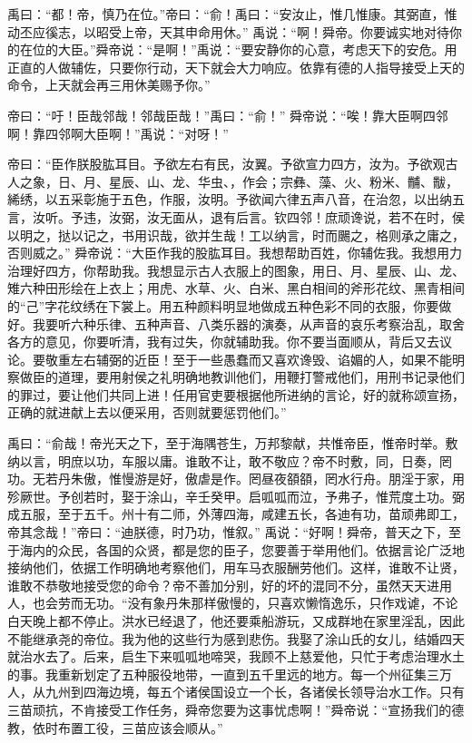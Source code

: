 \documentclass[a4paper,12pt,UTF8,twoside]{ctexbook}
\begin{document}
禹曰：“都！帝，慎乃在位。”帝曰：“俞！禹曰：“安汝止，惟几惟康。其弼直，惟动丕应徯志，以昭受上帝，天其申命用休。”
禹说：“啊！舜帝。你要诚实地对待你的在位的大臣。”舜帝说：“是啊！”禹说：“要安静你的心意，考虑天下的安危。用正直的人做辅佐，只要你行动，天下就会大力响应。依靠有德的人指导接受上天的命令，上天就会再三用休美赐予你。”

帝曰：“吁！臣哉邻哉！邻哉臣哉！”禹曰：“俞！”
舜帝说：“唉！靠大臣啊四邻啊！靠四邻啊大臣啊！”禹说：“对呀！”

帝曰：“臣作朕股肱耳目。予欲左右有民，汝翼。予欲宣力四方，汝为。予欲观古人之象，日、月、星辰、山、龙、华虫、，作会；宗彝、藻、火、粉米、黼、黻，絺绣，以五采彰施于五色，作服，汝明。予欲闻六律五声八音，在治忽，以出纳五言，汝听。予违，汝弼，汝无面从，退有后言。钦四邻！庶顽谗说，若不在时，侯以明之，挞以记之，书用识哉，欲并生哉！工以纳言，时而颺之，格则承之庸之，否则威之。”
舜帝说：“大臣作我的股肱耳目。我想帮助百姓，你辅佐我。我想用力治理好四方，你帮助我。我想显示古人衣服上的图象，用日、月、星辰、山、龙、雉六种田形绘在上衣上；用虎、水草、火、白米、黑白相间的斧形花纹、黑青相间的“己”字花纹绣在下裳上。用五种颜料明显地做成五种色彩不同的衣服，你要做好。我要听六种乐律、五种声音、八类乐器的演奏，从声音的哀乐考察治乱，取舍各方的意见，你要听清，我有过失，你就辅助我。你不要当面顺从，背后又去议论。要敬重左右辅弼的近臣！至于一些愚蠢而又喜欢谗毁、谄媚的人，如果不能明察做臣的道理，要用射侯之礼明确地教训他们，用鞭打警戒他们，用刑书记录他们的罪过，要让他们共同上进！任用官吏要根据他所进纳的言论，好的就称颂宣扬，正确的就进献上去以便采用，否则就要惩罚他们。”

禹曰：“俞哉！帝光天之下，至于海隅苍生，万邦黎献，共惟帝臣，惟帝时举。敷纳以言，明庶以功，车服以庸。谁敢不让，敢不敬应？帝不时敷，同，日奏，罔功。无若丹朱傲，惟慢游是好，傲虐是作。罔昼夜頟頟，罔水行舟。朋淫于家，用殄厥世。予创若时，娶于涂山，辛壬癸甲。启呱呱而泣，予弗子，惟荒度土功。弼成五服，至于五千。州十有二师，外薄四海，咸建五长，各迪有功，苗顽弗即工，帝其念哉！”帝曰：“迪朕德，时乃功，惟叙。”
禹说：“好啊！舜帝，普天之下，至于海内的众民，各国的众贤，都是您的臣子，您要善于举用他们。依据言论广泛地接纳他们，依据工作明确地考察他们，用车马衣服酬劳他们。这样，谁敢不让贤，谁敢不恭敬地接受您的命令？帝不善加分别，好的坏的混同不分，虽然天天进用人，也会劳而无功。“没有象丹朱那样傲慢的，只喜欢懒惰逸乐，只作戏谑，不论白天晚上都不停止。洪水已经退了，他还要乘船游玩，又成群地在家里淫乱，因此不能继承尧的帝位。我为他的这些行为感到悲伤。我娶了涂山氏的女儿，结婚四天就治水去了。后来，启生下来呱呱地啼哭，我顾不上慈爱他，只忙于考虑治理水土的事。我重新划定了五种服役地带，一直到五千里远的地方。每一个州征集三万人，从九州到四海边境，每五个诸侯国设立一个长，各诸侯长领导治水工作。只有三苗顽抗，不肯接受工作任务，舜帝您要为这事忧虑啊！”舜帝说：“宣扬我们的德教，依时布置工役，三苗应该会顺从。”
\end{document}
